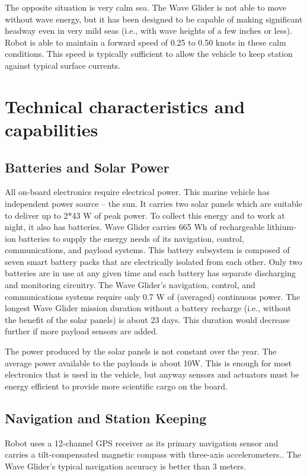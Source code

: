 The opposite situation is very calm sea. The Wave Glider is not able to move without wave energy, but it has been designed to be capable of making significant headway even in very mild seas (i.e., with wave heights of a few inches or less). Robot is able to maintain a forward speed of 0.25 to 0.50 knots in these calm conditions. This speed is typically sufficient to allow the vehicle to keep station against typical surface currents.


\section{Technical characteristics and capabilities}

\subsection{Batteries and Solar Power}

All on-board electronics require electrical power. This marine vehicle has independent power  source – the sun. It carries two solar panels which are suitable to deliver up to 2*43 W of peak power. To collect  this energy and to work at night, it also has batteries. Wave Glider carries 665 Wh of rechargeable lithium-ion batteries to supply the energy needs of its navigation, control, communications, and payload systems. This battery subsystem is composed of seven smart battery packs that are electrically isolated from each other. Only two batteries are in use at any given time and each battery has separate discharging and monitoring circuitry. The Wave Glider’s navigation, control, and communications systems require only 0.7 W of (averaged) continuous power. The longest Wave Glider mission duration without a battery recharge (i.e., without the benefit of the solar panels) is about 23 days. This duration would decrease further if more payload sensors are added. \cite{5422129}


The power produced by the solar panels is not constant  over the year. The average power available to the payloads  is about 10W. This is enough for most electronics that is used in the vehicle, but anyway sensors and actuators must be energy efficient to provide more scientific cargo on the board. 

\subsection{Navigation and Station Keeping}

Robot uses a 12-channel GPS receiver as its primary navigation sensor and carries a tilt-compensated magnetic compass with three-axis accelerometers.. The Wave Glider’s typical navigation accuracy is better than 3 meters.

